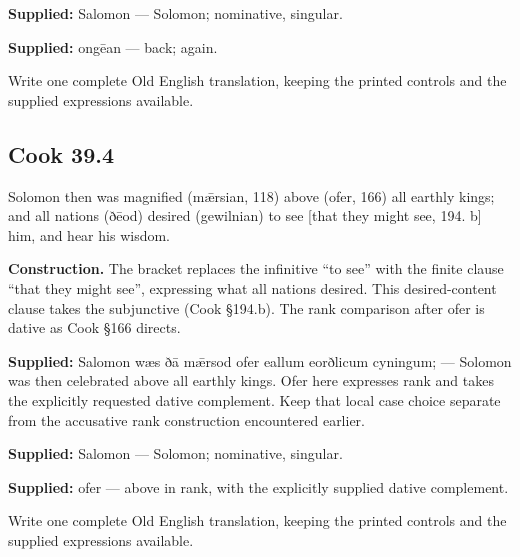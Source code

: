 \textbf{Supplied:} Salomon — Solomon; nominative, singular.

\textbf{Supplied:} ongēan — back; again.

Write one complete Old English translation, keeping the printed controls and the supplied expressions available.

\par\begin{minipage}{\linewidth}\raggedright
\subsection*{Cook 39.4}

Solomon then was magnified (mǣrsian, 118) above (ofer, 166) all earthly kings; and all nations (ðēod) desired (gewilnian) to see [that they might see, 194. b] him, and hear his wisdom.

\end{minipage}\par\addvspace{4pt}

\textbf{Construction.} The bracket replaces the infinitive “to see” with the finite clause “that they might see”, expressing what all nations desired. This desired-content clause takes the subjunctive (Cook §194.b). The rank comparison after ofer is dative as Cook §166 directs.

\textbf{Supplied:} Salomon wæs ðā mǣrsod ofer eallum eorðlicum cyningum; — Solomon was then celebrated above all earthly kings. Ofer here expresses rank and takes the explicitly requested dative complement. Keep that local case choice separate from the accusative rank construction encountered earlier.

\textbf{Supplied:} Salomon — Solomon; nominative, singular.

\textbf{Supplied:} ofer — above in rank, with the explicitly supplied dative complement.

Write one complete Old English translation, keeping the printed controls and the supplied expressions available.

